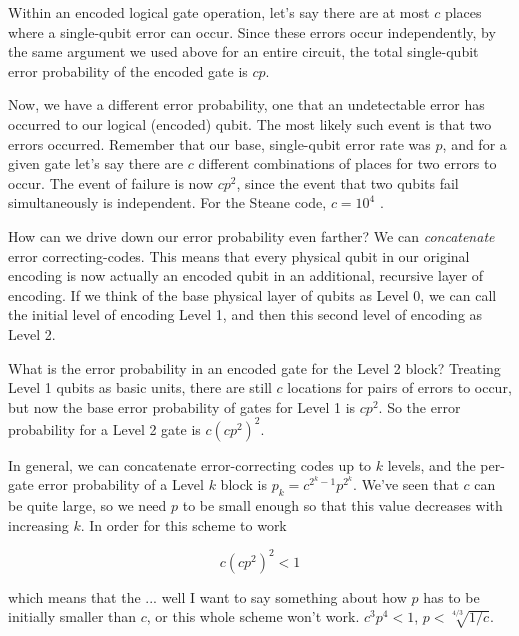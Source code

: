 Within an encoded logical gate operation, let's say there are at most $c$
places where a single-qubit error can occur. Since these errors occur
independently, by the same argument we used above for an entire circuit,
the total single-qubit error probability of the encoded gate is $cp$.

Now, we have a different error probability, one that an undetectable error
has occurred to our logical (encoded) qubit. The most likely such event is that
two errors occurred. Remember that our base, single-qubit error rate was
$p$, and for a given gate let's say there are $c$ different combinations of
places for two errors to occur. The event of failure is now $cp^2$, since the
event that two qubits fail simultaneously is independent. For the Steane
code, $c=10^4$ \cite{Nielsen2000}.

How can we drive down our error probability even farther?
We can \emph{concatenate} error correcting-codes. This means
that every physical qubit in our original encoding is now actually an
encoded qubit in an additional, recursive layer of encoding. If we think of
the base physical layer of qubits as Level 0, we can call the
initial level of encoding Level 1, and then this second level of encoding
as Level 2.


What is the error probability in an encoded gate for the Level 2 block?
Treating Level 1 qubits as basic units, there are still $c$ locations for
pairs of errors to occur, but now the base error probability of gates for
Level 1 is $cp^2$. So the error probability for a Level 2 gate is
$c(cp^2)^2$.

In general, we can concatenate error-correcting codes up to $k$ levels, and
the per-gate error probability of a Level $k$ block is $p_k = c^{2^k-1}p^{2^k}$.
We've seen that $c$ can be quite large, so we need $p$ to be small enough
so that this value decreases with increasing $k$. In order for this scheme
to work

\begin{displaymath}
c(cp^2)^2 < 1
\end{displaymath}

which means that the ... well I want to say something about how $p$ has
to be initially smaller than $c$, or this whole scheme won't work.
$c^3 p^4 < 1$, $p < \sqrt[4/3]{1/c}$.

